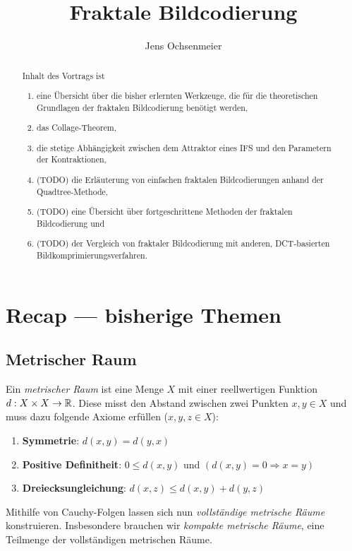 \documentclass[afourpaper]{tufte-handout}
\title{Fraktale Bildcodierung}
\author{Jens Ochsenmeier}
\date{}
\begin{document}
\maketitle%

\begin{abstract}
\noindent
  Inhalt des Vortrags ist
  \begin{enumerate}
    \item eine Übersicht über die bisher erlernten Werkzeuge, die für die theoretischen Grundlagen der fraktalen Bildcodierung benötigt werden,
    \item das Collage-Theorem,
    \item die stetige Abhängigkeit zwischen dem Attraktor eines IFS und den Parametern der Kontraktionen,
    \item (TODO) die Erläuterung von einfachen fraktalen Bildcodierungen anhand der Quadtree-Methode,
    \item (TODO) eine Übersicht über fortgeschrittene Methoden der fraktalen Bildcodierung und
    \item (TODO) der Vergleich von fraktaler Bildcodierung mit anderen, DCT-basierten Bildkomprimierungsverfahren.
  \end{enumerate}
\end{abstract}

\section{Recap --- bisherige Themen}

\subsection{Metrischer Raum}

Ein \emph{metrischer Raum} ist eine Menge \( X \) mit einer reellwertigen Funktion \( d: X \times X \to \mathbb{R} \). Diese misst den Abstand zwischen zwei Punkten \( x,y \in X \) und muss dazu folgende Axiome erfüllen (\( x,y,z \in X \)):
\begin{enumerate}
  \item \textbf{Symmetrie}: \( d(x,y) = d(y,x) \)
  \item \textbf{Positive Definitheit}: \( 0 \leq d(x,y) \) und \( (d(x,y) = 0 \Rightarrow x = y) \)
  \item \textbf{Dreiecksungleichung}: \( d(x,z) \leq d(x,y) + d(y,z) \)
\end{enumerate}

Mithilfe von Cauchy-Folgen lassen sich nun \emph{vollständige metrische Räume} konstruieren. Insbesondere brauchen wir \emph{kompakte metrische Räume}, eine Teilmenge der vollständigen metrischen Räume.
\end{document}
